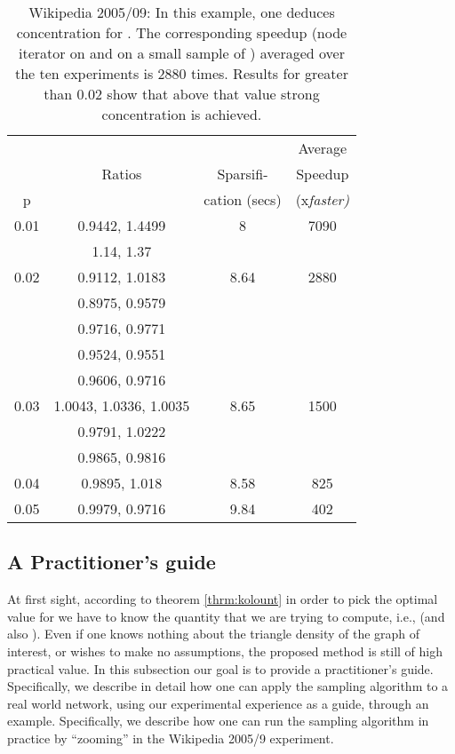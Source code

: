 \documentclass{llncs}
\begin{document}
\begin{table}[ht]
\begin{center}
\begin{tabular}{c|c|c|c}
    &  & & Average   \\ 
     & Ratios & Sparsifi-   & Speedup  \\ 
    p    & \large{ }   & cation (secs) & (x\it{faster})  \\ \hline \hline
   
   0.01 & 0.9442,  1.4499    &   8      &     7090               \\
        & 1.14, 1.37         &         &                    \\ \hline
   0.02 & 0.9112, 1.0183 & 8.64  & 2880 \\
        & 0.8975, 0.9579                                          &       & \\
        & 0.9716, 0.9771                                          &       & \\
        & 0.9524, 0.9551                                         &       & \\
        & 0.9606, 0.9716                                        &       & \\ \hline
   0.03 & 1.0043, 1.0336, 1.0035  &  8.65 &1500      \\
        & 0.9791, 1.0222 &    &   \\
        & 0.9865, 0.9816 &    &   \\  \hline
   0.04 & 0.9895, 1.018  &   8.58 &  825   \\ \hline
   0.05 & 0.9979, 0.9716    & 9.84 &  402   \\
   
    
\end{tabular}
\end{center}
\caption{ Wikipedia 2005/09: In this example, one deduces concentration for . The corresponding speedup 
(node iterator on  and on a small sample of ) averaged over the ten experiments is 2880 times. Results for  greater
than 0.02 show that above that value strong concentration is achieved. }
\label{tab:wiki2005}
\end{table}





\subsection{A Practitioner's guide}


At first sight, according to theorem \ref{thrm:kolount} in order to pick the optimal value for 
 we have to know the quantity that we are trying to compute, i.e.,  (and also ). 
Even if one knows nothing about the triangle density of the graph of interest, or wishes
to make no assumptions, the proposed method is still of high practical value. 
In this subsection our goal is to provide a practitioner's guide. 
Specifically, we describe in detail how one can apply the sampling algorithm to 
a real world network, using our experimental experience as a guide, through an example.
Specifically, we describe how one can run the sampling algorithm in practice
by ``zooming'' in the Wikipedia 2005/9 experiment. 
\end{document}
